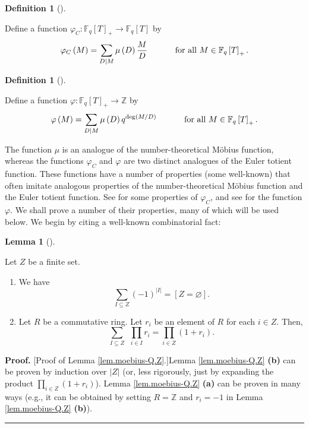 \documentclass[numbers=enddot,12pt,final,onecolumn,notitlepage]{scrartcl}%
\theoremstyle{definition}
\newtheorem{lem}[theo]{Lemma}
\newenvironment{lemma}[1][]
{\begin{lem}[#1]\begin{leftbar}}
{\end{leftbar}\end{lem}}
\newtheorem{defi}[theo]{Definition}
\newenvironment{definition}[1][]
{\begin{defi}[#1]\begin{leftbar}}
{\end{leftbar}\end{defi}}
\newenvironment{proof}[1][Proof]{\noindent\textbf{#1.} }{\ \rule{0.5em}{0.5em}}
\let\sumnonlimits\sum
\let\prodnonlimits\prod
\renewcommand{\sum}{\sumnonlimits\limits}
\renewcommand{\prod}{\prodnonlimits\limits}
\begin{document}
\begin{definition}
\label{def.phiC-q}Define a function $\varphi_{C}:\mathbb{F}_{q}\left[
T\right]  _{+}\rightarrow\mathbb{F}_{q}\left[  T\right]  $ by%
\[
\varphi_{C}\left(  M\right)  =\sum\limits_{D\mid M}\mu\left(  D\right)
\dfrac{M}{D}\ \ \ \ \ \ \ \ \ \ \text{for all }M\in\mathbb{F}_{q}\left[
T\right]  _{+}.
\]

\end{definition}

\begin{definition}
\label{def.phi-q}Define a function $\varphi:\mathbb{F}_{q}\left[  T\right]
_{+}\rightarrow\mathbb{Z}$ by%
\[
\varphi\left(  M\right)  =\sum\limits_{D\mid M}\mu\left(  D\right)
q^{\deg\left(  M/D\right)  }\ \ \ \ \ \ \ \ \ \ \text{for all }M\in
\mathbb{F}_{q}\left[  T\right]  _{+}.
\]

\end{definition}

The function $\mu$ is an analogue of the number-theoretical M\"{o}bius
function, whereas the functions $\varphi_{C}$ and $\varphi$ are two distinct
analogues of the Euler totient function. These functions have a number of
properties (some well-known) that often imitate analogous properties of the
number-theoretical M\"{o}bius function and the Euler totient function. See
\cite[Theorem 4.5]{kc-carlitz} for some properties of $\varphi_{C}$, and see
\cite[Section 6]{kc-carlitz} for the function $\varphi$. We shall prove a
number of their properties, many of which will be used below. We begin by
citing a well-known combinatorial fact:

\begin{lemma}
\label{lem.moebius-Q.Z}Let $Z$ be a finite set.

\begin{enumerate}
\item[\textbf{(a)}] We have%
\[
\sum_{I\subseteq Z}\left(  -1\right)  ^{\left\vert I\right\vert }=\left[
Z=\varnothing\right]  .
\]


\item[\textbf{(b)}] Let $R$ be a commutative ring. Let $r_{i}$ be an element
of $R$ for each $i\in Z$. Then,%
\[
\sum_{I\subseteq Z}\ \ \prod_{i\in I}r_{i}=\prod_{i\in Z}\left(
1+r_{i}\right)  .
\]

\end{enumerate}
\end{lemma}

\begin{proof}
[Proof of Lemma \ref{lem.moebius-Q.Z}.]Lemma \ref{lem.moebius-Q.Z}
\textbf{(b)} can be proven by induction over $\left\vert Z\right\vert $ (or,
less rigorously, just by expanding the product $\prod_{i\in Z}\left(
1+r_{i}\right)  $). Lemma \ref{lem.moebius-Q.Z} \textbf{(a)} can be proven in
many ways (e.g., it can be obtained by setting $R=\mathbb{Z}$ and $r_{i}=-1$
in Lemma \ref{lem.moebius-Q.Z} \textbf{(b)}).
\end{proof}
\end{document}
